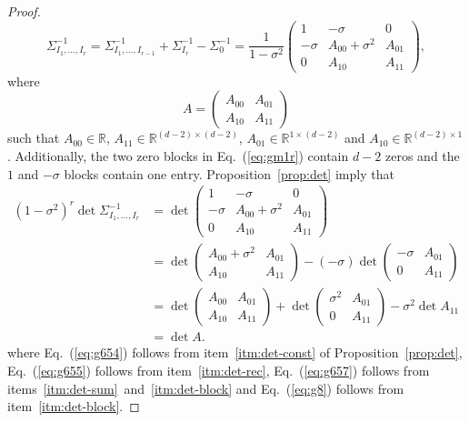 \documentclass[final, 12pt]{colt2018}
\renewcommand{\eqref}[1]{Eq.~(\ref{#1})}
\begin{document}
\begin{proof}
\begin{equation} \label{eq:gm1r}
\Sigma_{I_1,\dots,I_r}^{-1} 
= \Sigma_{I_1,\dots, I_{r-1}}^{-1} + \Sigma_{I_r}^{-1} - \Sigma_0^{-1}
= \frac{1}{1-\sigma^2} \begin{pmatrix}
1 & -\sigma & 0 \\
-\sigma & A_{00} + \sigma^2 & A_{01} \\
0 & A_{10} & A_{11}
\end{pmatrix},
\end{equation}
where 
\[
A = \begin{pmatrix}
A_{00} & A_{01} \\
A_{10} & A_{11}
\end{pmatrix}
\]
such that $A_{00} \in \mathbb{R}$, $A_{11} \in \mathbb{R}^{(d-2)\times (d-2)}$, $A_{01} \in \mathbb{R}^{1\times (d-2)}$ and $A_{10} \in \mathbb{R}^{(d-2)\times 1}$. Additionally, the two zero blocks in \eqref{eq:gm1r} contain $d-2$ zeros and the $1$ and $-\sigma$ blocks contain one entry. Proposition~\ref{prop:det} imply that
\begin{align}
(1-\sigma^2)^r \det \Sigma^{-1}_{I_1,\dots,I_r}
&= \det \begin{pmatrix}
1 & -\sigma & 0 \\
-\sigma & A_{00} + \sigma^2 & A_{01} \\
0 & A_{10} & A_{11}
\end{pmatrix} \label{eq:g654}\\
&= \det \begin{pmatrix}
A_{00} + \sigma^2 & A_{01}\\
A_{10} & A_{11}
\end{pmatrix}
- (-\sigma) \det \begin{pmatrix}
-\sigma & A_{01} \\
0 & A_{11}
\end{pmatrix} \label{eq:g655}\\
&= \det \begin{pmatrix}
A_{00} & A_{01} \\
A_{10} & A_{11}
\end{pmatrix}
+ \det \begin{pmatrix}
\sigma^2 & A_{01} \\
0 & A_{11}
\end{pmatrix}
- \sigma^2 \det A_{11} \label{eq:g657} \\
&= \det A. \label{eq:g8}
\end{align}
where \eqref{eq:g654} follows from item~\ref{itm:det-const} of Proposition~\ref{prop:det}, \eqref{eq:g655} follows from item~\ref{itm:det-rec}, \eqref{eq:g657} follows from items~\ref{itm:det-sum}~and~\ref{itm:det-block} and \eqref{eq:g8} follows from item~\ref{itm:det-block}.

\end{proof}
\end{document}
